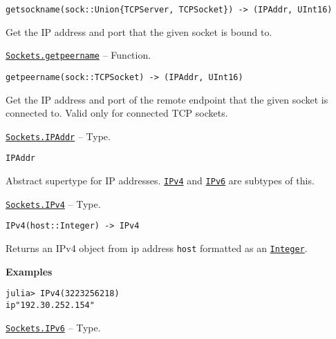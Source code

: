 \begin{adjustwidth}{2em}{0pt}


\begin{verbatim}
getsockname(sock::Union{TCPServer, TCPSocket}) -> (IPAddr, UInt16)
\end{verbatim}

Get the IP address and port that the given socket is bound to.



\end{adjustwidth}
\hypertarget{3342627656847235889}{} 
\hyperlink{3342627656847235889}{\texttt{Sockets.getpeername}}  -- {Function.}

\begin{adjustwidth}{2em}{0pt}


\begin{verbatim}
getpeername(sock::TCPSocket) -> (IPAddr, UInt16)
\end{verbatim}

Get the IP address and port of the remote endpoint that the given socket is connected to. Valid only for connected TCP sockets.



\end{adjustwidth}
\hypertarget{8098410990676145612}{} 
\hyperlink{8098410990676145612}{\texttt{Sockets.IPAddr}}  -- {Type.}

\begin{adjustwidth}{2em}{0pt}


\begin{verbatim}
IPAddr
\end{verbatim}

Abstract supertype for IP addresses. \hyperlink{3367105148999996858}{\texttt{IPv4}} and \hyperlink{14863381148391509384}{\texttt{IPv6}} are subtypes of this.



\end{adjustwidth}
\hypertarget{3367105148999996858}{} 
\hyperlink{3367105148999996858}{\texttt{Sockets.IPv4}}  -- {Type.}

\begin{adjustwidth}{2em}{0pt}


\begin{verbatim}
IPv4(host::Integer) -> IPv4
\end{verbatim}

Returns an IPv4 object from ip address \texttt{host} formatted as an \hyperlink{8469131683393450448}{\texttt{Integer}}.

\textbf{Examples}


\begin{verbatim}
julia> IPv4(3223256218)
ip"192.30.252.154"
\end{verbatim}



\end{adjustwidth}
\hypertarget{14863381148391509384}{} 
\hyperlink{14863381148391509384}{\texttt{Sockets.IPv6}}  -- {Type.}

